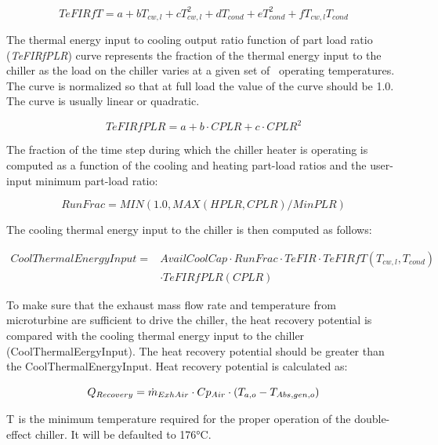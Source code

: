\begin{equation}
TeFIRfT = a + b{T_{cw,l}} + cT_{cw,l}^2 + d{T_{cond}} + eT_{cond}^2 + f{T_{cw,l}}{T_{cond}}
\end{equation}

The thermal energy input to cooling output ratio function of part load ratio (\emph{TeFIRfPLR}) curve represents the fraction of the thermal energy input to the chiller as the load on the chiller varies at a given set of~ operating temperatures. The curve is normalized so that at full load the value of the curve should be 1.0. The curve is usually linear or quadratic.

\begin{equation}
TeFIRfPLR = a + b \cdot CPLR + c \cdot CPL{R^2}
\end{equation}

The fraction of the time step during which the chiller heater is operating is computed as a function of the cooling and heating part-load ratios and the user-input minimum part-load ratio:

\begin{equation}
RunFrac = MIN(1.0,MAX\left( {HPLR,CPLR} \right)/MinPLR)
\end{equation}

The cooling thermal energy input to the chiller is then computed as follows:

\begin{equation}
\begin{split}
CoolThermalEnergyInput =& AvailCoolCap \cdot RunFrac \cdot TeFIR \cdot TeFIRfT\left( {{T_{cw,l}},{T_{cond}}} \right) \\
&\cdot TeFIRfPLR(CPLR)
\end{split}
\end{equation}

To make sure that the exhaust mass flow rate and temperature from microturbine are sufficient to drive the chiller, the heat recovery potential is compared with the cooling thermal energy input to the chiller (CoolThermalEergyInput). The heat recovery potential should be greater than the CoolThermalEnergyInput. Heat recovery potential is calculated as:

\begin{equation}
{Q_{Recovery}} = {\dot m_{ExhAir}} \cdot {\rm{}}C{p_{Air}} \cdot {\rm{}}({T_{a,o}} - {T_{Abs,gen,o}})
\end{equation}

T\(_{ }\) is the minimum temperature required for the proper operation of the double-effect chiller. It will be defaulted to 176°C.

